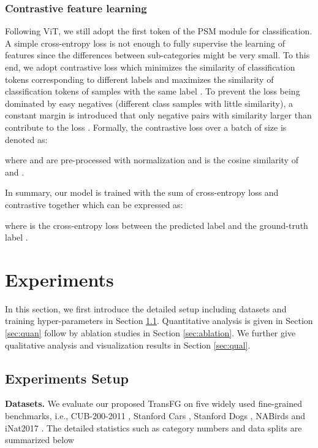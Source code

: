 \documentclass[10pt,twocolumn,letterpaper]{article}
\begin{document}
\subsubsection{Contrastive feature learning}
Following ViT, we still adopt the first token  of the PSM module for classification. A simple cross-entropy loss is not enough to fully supervise the learning of features since the differences between sub-categories might be very small. To this end, we adopt contrastive loss  which minimizes the similarity of classification tokens corresponding to different labels and maximizes the similarity of classification tokens of samples with the same label . To prevent the loss being dominated by easy negatives (different class samples with little similarity), a constant margin  is introduced that only negative pairs with similarity larger than  contribute to the loss . Formally, the contrastive loss over a batch of size  is denoted as:

where  and  are pre-processed with  normalization and  is the cosine similarity of  and .

In summary, our model is trained with the sum of cross-entropy loss  and contrastive  together which can be expressed as:

where  is the cross-entropy loss between the predicted label  and the ground-truth label .
 \section{Experiments}
\label{sec:exp}

In this section, we first introduce the detailed setup including datasets and training hyper-parameters in Section \ref{sec:setup}. Quantitative analysis is given in Section \ref{sec:quan} follow by ablation studies in Section \ref{sec:ablation}. We further give qualitative analysis and visualization results in Section \ref{sec:qual}.

\subsection{Experiments Setup}
\label{sec:setup}

\textbf{Datasets.} We evaluate our proposed TransFG on five widely used fine-grained benchmarks, i.e., CUB-200-2011 \cite{WahCUB_200_2011}, Stanford Cars \cite{KrauseStarkDengFei-Fei_3DRR2013}, Stanford Dogs \cite{KhoslaYaoJayadevaprakashFeiFei_FGVC2011}, NABirds \cite{van2015building} and iNat2017 \cite{vanhorn2018inaturalist}. The detailed statistics such as category numbers and data splits are summarized below
\end{document}
